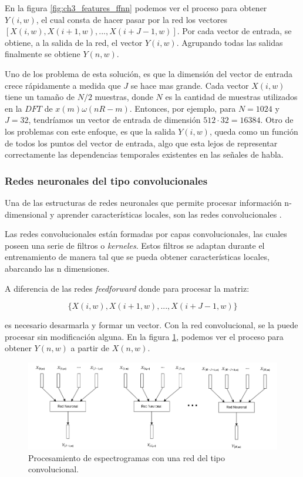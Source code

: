 En la figura \ref{fig:ch3_features_ffnn} podemos ver el proceso para obtener $Y(i, w)$, el cual consta de hacer pasar por la red los vectores $[X(i, w), X(i+1, w), ..., X(i+J-1, w)]$. Por cada vector de entrada, se obtiene, a la salida de la red, el vector $Y(i, w)$. Agrupando todas las salidas finalmente se obtiene $Y(n, w)$.

Uno de los problema de esta solución, es que la dimensión del vector de entrada crece rápidamente a medida que $J$ se hace mas grande. Cada vector $X(i, w)$ tiene un tamaño de $N/2$ muestras, donde $N$ es la cantidad de muestras utilizados en la $DFT$ de $x(m) \omega(nR-m)$. Entonces, por ejemplo, para $N=1024$ y $J=32$, tendríamos un vector de entrada de dimensión $512 \cdot 32 = 16384$. Otro de los problemas con este enfoque, es que la salida $Y(i, w)$, queda como un función de todos los puntos del vector de entrada, algo que esta lejos de representar correctamente las dependencias temporales existentes en las señales de habla.

\subsubsection{Redes neuronales del tipo convolucionales}
\label{sec:redes_convolucionales}

Una de las estructuras de redes neuronales que permite procesar información n-dimensional y aprender características locales, son las redes convolucionales \cite{deep_learning}. 

Las redes convolucionales están formadas por capas convolucionales, las cuales poseen una serie de filtros o \emph{kerneles}. Estos filtros se adaptan durante el entrenamiento de manera tal que se pueda obtener características locales, abarcando las n dimensiones.

A diferencia de las redes \emph{feedforward} donde para procesar la matriz:

\begin{equation*}
	\{X(i, w), X(i+1, w), ..., X(i+J-1, w)\}
\end{equation*}

\noindent es necesario desarmarla y formar un vector. Con la red convolucional, se la puede procesar sin modificación alguna. En la figura \ref{fig:ch3_features_cnn}, podemos ver el proceso para obtener $Y(n, w)$ a partir de $X(n, w)$.

\begin{figure}
	\centering
	\centerline{\includegraphics[scale=0.5]{images/ch3/features-cnn.png}}
	\caption{Procesamiento de espectrogramas con una red del tipo convolucional.}
	\label{fig:ch3_features_cnn}
\end{figure}

